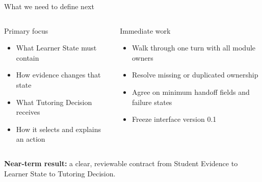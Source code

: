 \documentclass[aspectratio=169,10pt]{beamer}
\begin{document}
\begin{frame}{What we need to define next}
\begin{columns}[T,onlytextwidth]
\begin{block}{Primary focus}
\begin{itemize}
\item What Learner State must contain
\item How evidence changes that state
\item What Tutoring Decision receives
\item How it selects and explains an action
\end{itemize}
\end{block}
\begin{block}{Immediate work}
\begin{itemize}
\item Walk through one turn with all module owners
\item Resolve missing or duplicated ownership
\item Agree on minimum handoff fields and failure states
\item Freeze interface version 0.1
\end{itemize}
\end{block}
\end{columns}
\vspace{.45em}
\centering
\textbf{Near-term result:} a clear, reviewable contract from Student Evidence to Learner State to Tutoring Decision.
\end{frame}
\end{document}
